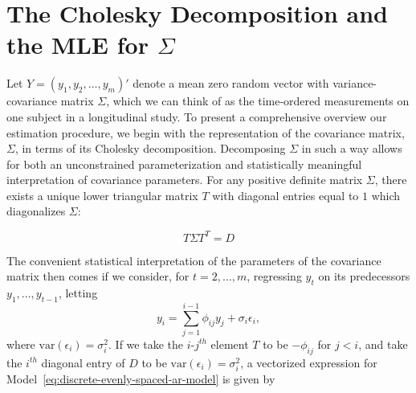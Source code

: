 \documentclass[12pt]{article}
\theoremstyle{definition}
\begin{document}
{{\section{The Cholesky Decomposition and the MLE for $\Sigma$}

Let $Y = \left( y_{1}, y_{2}, \dots, y_{m} \right)'$ denote a mean zero random vector with variance-covariance matrix $\Sigma$, which we can think of as the time-ordered measurements on one subject in a longitudinal study. To present a comprehensive overview our estimation procedure, we begin with the representation of the covariance matrix, $\Sigma$, in terms of its Cholesky decomposition. Decomposing $\Sigma$ in such a way allows for both an unconstrained parameterization and statistically meaningful interpretation of covariance parameters. For any positive definite matrix $\Sigma$, there exists a unique lower triangular matrix $T$ with diagonal entries equal to $1$ which diagonalizes $\Sigma$:

\begin{equation} \label{eq:T-Sigma-Ttrans-equals-D}
 T \Sigma T^T = D
\end{equation}
\noindent

The convenient statistical interpretation of the parameters of the covariance matrix then comes if we consider, for $t = 2, \dots, m$, regressing $y_t$ on its predecessors $y_1,\dots, y_{t-1}$, letting
\begin{equation} 
{y}_{i}  = \sum_{j=1}^{i-1} \phi_{ij} y_{j} + \sigma_{i}\epsilon_{i} \label{eq:discrete-evenly-spaced-ar-model},
\end{equation}
\noindent
where $\mbox{var}\left( \epsilon_i \right) = \sigma_i^2$. If we take the $i$-$j^{th}$ element $T$ to be $-\phi_{ij}$ for $j < i$, and take the $i^{th}$ diagonal entry of $D$ to be $\mbox{var}\left( \epsilon_i \right) = \sigma_i^2$, a vectorized expression for Model~\ref{eq:discrete-evenly-spaced-ar-model} is given by

}}
\end{document}
